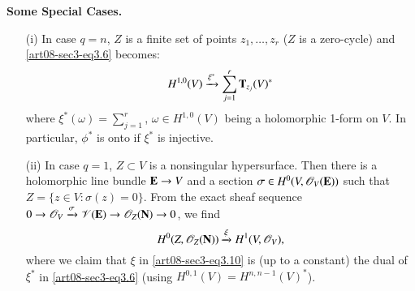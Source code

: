 \medskip
\noindent
{\bf Some Special Cases.}
\begin{itemize}
\item[(i)] In case $q=n$, $Z$ is a finite set of points $z_{1},\ldots,z_{r}$ ($Z$ is a zero-cycle) and \eqref{art08-sec3-eq3.6} becomes:
\begin{equation}
H^{1,0}(V)\xrightarrow{\xi^{*}}\sum\limits^{r}_{j=1}\mathbf{T}_{z_{j}}(V)^{*}\label{art08-sec3-eq3.9}
\end{equation}
where $\xi^{*}(\omega)=\sum\limits^{r}_{j=1}$, $\omega\in H^{1,0}(V)$ being a holomorphic 1-form on $V$. In particular, $\phi^{*}$ is onto if $\xi^{*}$ is injective.

\item[(ii)] In case $q=1$, $Z\subset V$ is a nonsingular hypersurface. Then there is a holomorphic line bundle $\mathbf{E}\to V$ and a section $\sigma\in H^{0}(V,\mathscr{O}_{V}(\mathbf{E}))$ such that $Z=\{z\in V:\sigma(z)=0\}$. From the exact sheaf sequence $0\to \mathscr{O}_{V}\xrightarrow{\sigma}\mathscr{V}(\mathbf{E})\to \mathscr{O}_{Z}(\mathbf{N})\to 0$, we find
\begin{equation}
H^{0}(Z,\mathscr{O}_{Z}(\mathbf{N}))\xrightarrow{\xi}H^{1}(V,\mathscr{O}_{V}),\label{art08-sec3-eq3.10}
\end{equation}
where we claim that $\xi$ in \eqref{art08-sec3-eq3.10} is (up to a constant) the dual of $\xi^{*}$ in \eqref{art08-sec3-eq3.6} (using $H^{0,1}(V)=H^{n,n-1}(V)^{*}$).
\end{itemize}

